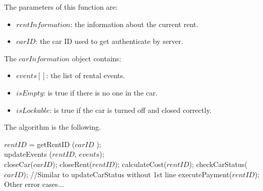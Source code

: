 The parameters of this function are:
\begin{itemize}
	\item $rentInformation$: the information about the current rent.
	\item $carID$: the car ID used to get authenticate by server.
\end{itemize}
The $carInformation$ object contains:
\begin{itemize}
	\item $events[]$: the list of rental events.
	\item $isEmpty$: is true if there is no one in the car.
	\item $isLockable$: is true if the car is turned off and closed correctly.
\end{itemize}
The algorithm is the following.

\bigskip

\begin{algorithm}[H]
\small
	$rentID$ = {\color{blue} getRentID} ($carID$ ); \\
	{
		{\color{blue}updateEvents} ($rentID$, $events$); \\
	}
	{
		{
			closeCar($carID$);
			closeRent($rentID$);
			calculateCost($rentID$);
			checkCarStatus($carID$);  //Similar to updateCarStatus without 1st line
			executePayment($rentID$);
		}
	}
	Other error cases...
\end{algorithm}
